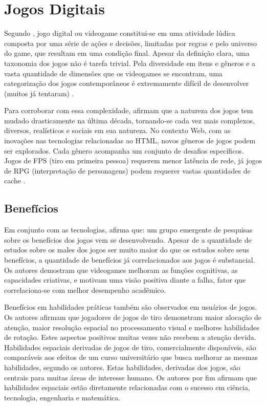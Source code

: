 \section{Jogos Digitais}

Segundo \citet{indieGamesLemes}, jogo digital ou videogame constitui-se em uma
atividade lúdica composta por uma série de ações e decisões,
limitadas por regras e pelo universo do game, que resultam em uma
condição final. Apesar da definição clara, uma taxonomia dos jogos
não é tarefa trivial. Pela diversidade em itens e gêneros e a
vasta quantidade de dimensões que os videogames se encontram, uma
categorização dos jogos contemporâneos é extremamente difícil de
desenvolver (muitos já tentaram) \autocite[p. 60]{gamebenefits}.

Para corroborar com essa complexidade, \citet{gamebenefits} afirmam
que a natureza dos jogos tem mudado drasticamente na última década,
tornando-se cada vez mais complexos, diversos, realísticos e sociais
em sua natureza. No contexto Web, com as inovações nas tecnologias
relacionadas ao HTML, novos gêneros de jogos podem ser
explorados. Cada gênero acompanha um conjunto de desafios
específicos. Jogos de FPS (tiro em primeira pessoa) requerem menor
latência de rede, já jogos de RPG (interpretação de personagens)
podem requerer vastas quantidades de cache \autocite{html5mostwanted}.

\subsection{Benefícios}

Em conjunto com as tecnologias, \citet{gamebenefits} afirma que:
\textquotedbl um grupo emergente de pesquisas sobre os benefícios
dos jogos vem se desenvolvendo\textquotedbl{}. Apesar de a quantidade
de estudos sobre os males dos jogos ser muito maior do que os estudos
sobre seus benefícios, a quantidade de benefícios já correlacionados
aos jogos é substancial. Os autores demostram que videogames melhoram
as funções cognitivas, as capacidades criativas, e motivam uma
visão positiva diante a falha, fator que correlaciona-se com melhor
desempenho acadêmico.

Benefícios em habilidades práticas também são observados em
usuários de jogos. Os autores afirmam que jogadores de jogos de tiro demonstram maior
alocação de atenção, maior resolução espacial no processamento
visual e melhores habilidades de rotação.
Estes aspectos positivos muitas vezes não recebem a atenção devida.
Habilidades espaciais derivadas de jogos de tiro, comercialmente
disponíveis, são comparáveis aos efeitos de um curso universitário
que busca melhorar as mesmas habilidades, segundo os autores. Estas
habilidades, derivadas dos jogos, são centrais para muitas áreas de
interesse humano. Os autores por fim afirmam que habilidades espaciais
estão diretamente relacionadas com o sucesso em ciência, tecnologia,
engenharia e matemática.

